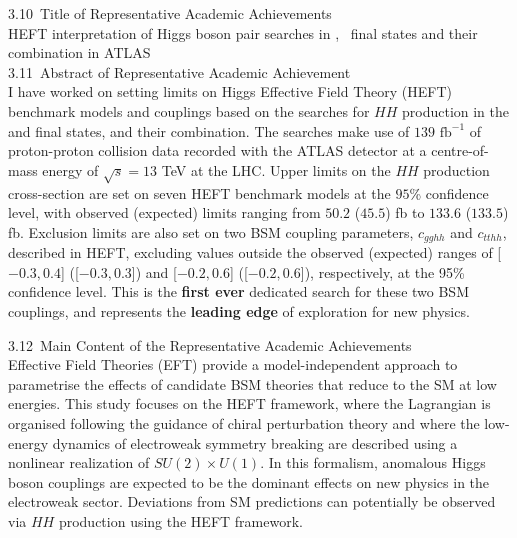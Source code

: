 \documentclass[twoside,11pt]{report}
\begin{document}
\Large{3.10\ Title of Representative Academic Achievements}\\
\normalsize
\newline
HEFT interpretation of Higgs boson pair searches in \bbyy, \bbtt\ final states and their combination in
ATLAS\\
\newline
\Large{3.11\ Abstract of Representative Academic Achievement}\\
\normalsize    
\newline
    I have worked on setting limits on Higgs Effective Field Theory (HEFT) benchmark models 
    and couplings based on the searches for $HH$ production in the \bbyy and \bbtautau final states, 
    and their combination. The searches make use of $139$ $\textrm{fb}^{-1}$ of proton-proton collision 
    data recorded with the ATLAS detector at a centre-of-mass energy of $\sqrt{s}=13$ TeV at the LHC. 
    Upper limits on the $HH$ production cross-section are set on seven HEFT benchmark models at the $95$\% confidence level, 
    with observed (expected) limits ranging from $50.2$ ($45.5$) fb to $133.6$ ($133.5$) fb. 
    Exclusion limits are also set on two BSM coupling parameters, 
    $c_{gghh}$ and $c_{tthh}$, described in HEFT, excluding values outside the observed (expected) 
    ranges of [$-0.3, 0.4$] ([$-0.3, 0.3$]) and [$-0.2, 0.6$] ([$-0.2, 0.6$]), respectively, at the 95\% confidence level.
    This is the \textbf{first ever} dedicated search for these two BSM couplings, and represents the \textbf{leading edge} of 
    exploration for new physics.
\newline

\Large{3.12\ Main Content of the Representative Academic Achievements}\\
\normalsize
\newline
Effective Field Theories (EFT) provide a model-independent approach to parametrise the effects of 
candidate BSM theories that reduce to the SM at low energies. This study focuses on the HEFT framework, where the 
Lagrangian is organised following the guidance of chiral perturbation theory and 
where the low-energy dynamics of electroweak symmetry breaking are described using a nonlinear 
realization of $SU(2)\times U(1)$. In this formalism, anomalous Higgs boson couplings are 
expected to be the dominant effects on new physics in the electroweak sector.
Deviations from SM predictions can potentially be observed via $HH$ production using the HEFT framework.
\end{document}
